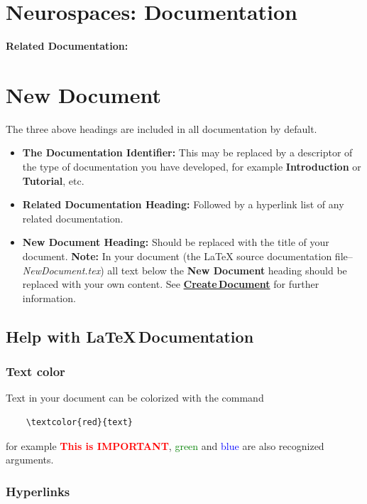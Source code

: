 \documentclass[12pt]{article}
\begin{document}
\section*{Neurospaces: Documentation}

{\bf Related Documentation:}

\section*{New Document}

The three above headings are included in all documentation by default.

\begin{itemize}
\item[]  {\bf The Documentation Identifier:} This may be replaced by a descriptor of the type of documentation you have developed, for example {\bf Introduction} or {\bf Tutorial}, etc.
\item[]{\bf Related Documentation Heading:} Followed by a hyperlink list of any related documentation.
\item[] {\bf New Document Heading:} Should be replaced with the title of your document. {\bf Note:} In your document (the \LaTeX\,\,source documentation file--{\it NewDocument.tex}) all text below the {\bf New Document} heading should be replaced with your own content. See \href{../document-create/document-create.tex}{\bf Create\,Document} for further information.
\end{itemize}

\subsection*{Help with \LaTeX\,Documentation}

\subsubsection*{Text color}

Text in your document can be colorized  with the command
\begin{verbatim}
    \textcolor{red}{text}
\end{verbatim}
for example \textcolor{red}{\bf This is IMPORTANT}, \textcolor{green}{green} and \textcolor{blue}{blue} are also recognized arguments.

\subsubsection*{Hyperlinks}
\end{document}
